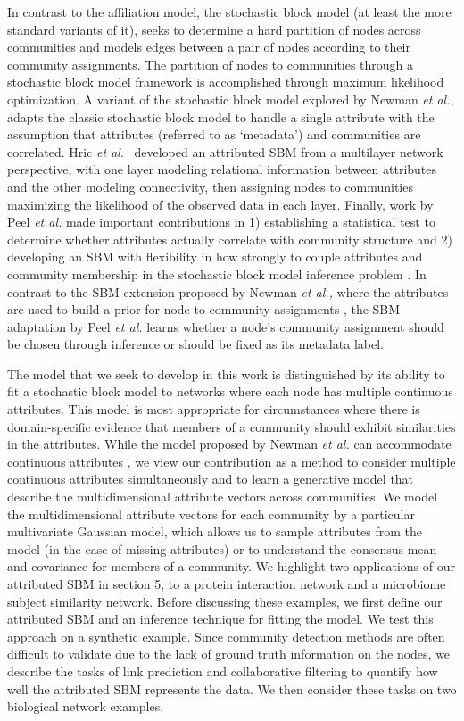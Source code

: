 In contrast to the affiliation model, the stochastic block model \cite{originalSBM} (at least the more standard variants of it), seeks to determine a hard partition of nodes across communities and models edges between a pair of nodes according to their community assignments. The partition of nodes to communities through a stochastic block model framework is accomplished through maximum likelihood optimization. A variant of the stochastic block model explored by Newman \emph{et al.}, \cite{clauset} adapts the classic stochastic block model to handle a single attribute with the assumption that attributes (referred to as `metadata') and communities are correlated. Hric \emph{et al}.~\cite{hric} developed an attributed SBM from a multilayer network perspective, with one layer modeling relational information between attributes and the other modeling connectivity, then assigning nodes to communities maximizing the likelihood of the observed data in each layer. Finally, work by Peel \emph{et al.} made important contributions in 1) establishing a statistical test to determine whether attributes actually correlate with community structure and 2) developing an SBM with flexibility in how strongly to couple attributes and community membership in the stochastic block model inference problem \cite{peel2017ground}. In contrast to the SBM extension proposed by Newman \emph{et al.,}  where the attributes are used to build a prior for node-to-community assignments \cite{clauset}, the SBM adaptation by Peel \emph{et al.} learns whether a node's community assignment should be chosen through inference or should be fixed as its metadata label. 

The model that we seek to develop in this work is distinguished by its ability to fit a stochastic block model to networks where each node has multiple continuous attributes. This model is most appropriate for circumstances where there is domain-specific evidence that members of a community should exhibit similarities in the attributes. While the model proposed by Newman \emph{et al.} can accommodate continuous attributes \cite{clauset}, we view our contribution as a method to consider multiple continuous attributes simultaneously and to learn a generative model that describe the multidimensional attribute vectors across communities. We model the multidimensional attribute vectors for each community by a particular multivariate Gaussian model, which allows us to  sample attributes from the model (in the case of missing attributes) or to understand the consensus mean and covariance for members of a community.  We highlight two applications of our attributed SBM in section 5,  to a protein interaction network and a microbiome subject similarity network. Before discussing these examples, we first define our attributed SBM and an inference technique for fitting the model. We test this approach on a synthetic example. Since community detection methods are often difficult to validate due to the lack of ground truth information on the nodes, we describe the tasks of link prediction and collaborative filtering to quantify how well the attributed SBM represents the data. We then consider these tasks on two biological network examples.

